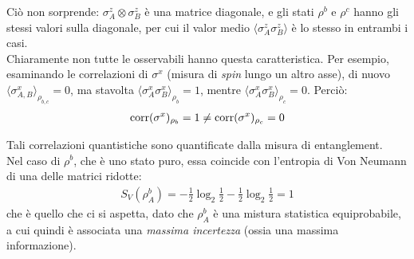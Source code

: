 \documentclass[../../InformazioneQuantistica.tex]{subfiles}
\begin{document}
Ciò non sorprende: $\sigma_A^z \otimes \sigma_B^z$ è una matrice diagonale, e gli stati $\rho^b$ e $\rho^c$ hanno gli stessi valori sulla diagonale, per cui il valor medio $\langle \sigma_A^z \sigma_B^z \rangle$ è lo stesso in entrambi i casi.\\ 
Chiaramente non tutte le osservabili hanno questa caratteristica. Per esempio, esaminando le correlazioni di $\sigma^x$ (misura di \textit{spin} lungo un altro asse), di nuovo $\langle \sigma_{A,B}^x \rangle_{\rho_{b,c}} = 0$, ma stavolta $\langle \sigma_A^x \sigma_B^x \rangle_{\rho_b} = 1$, mentre $\langle \sigma_A^x \sigma_B^x \rangle_{\rho_c} = 0$. Perciò:
\begin{align*}
    \operatorname{corr}(\sigma^x)_{\rho_b} = 1 \neq \operatorname{corr}(\sigma^x)_{\rho_c} = 0
\end{align*}

Tali correlazioni quantistiche sono quantificate dalla misura di entanglement.\\ 
Nel caso di $\rho^b$, che è uno stato puro, essa coincide con l'entropia di Von Neumann di una delle matrici ridotte:
\begin{align*}
S_V(\rho_{A}^b) = -\frac{1}{2} \log_2 \frac{1}{2} -\frac{1}{2}\log_2 \frac{1}{2} = 1
\end{align*}
che è quello che ci si aspetta, dato che $\rho_A^b$ è una mistura statistica equiprobabile, a cui quindi è associata una \textit{massima incertezza} (ossia una massima informazione).\\
\end{document}
